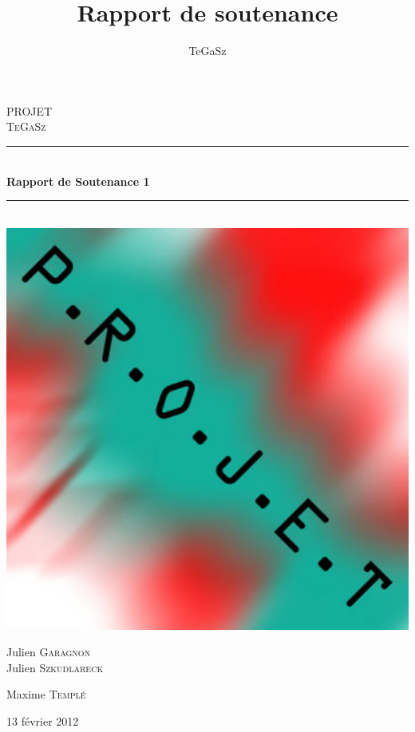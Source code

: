 \documentclass[12pt]{report}
\title{Rapport de soutenance \no{1}}
\date{}
\author{TeGaSz}
\newcommand{\HRule}{\rule{\linewidth}{0.5mm}}
\begin{document}
\begin{titlepage}



\begin{center}



\textsc{\LARGE PROJET}\\[1.5cm]

\textsc{\Large TeGaSz}\\[0.5cm]


\HRule \\[0.4cm]
{ \huge \bfseries Rapport de Soutenance 1}\\[0.4cm]
  
\HRule \\[1.5cm]
\includegraphics[width=1\textwidth]{./name.jpg}\\[1cm]  
\begin{minipage}{0.4\textwidth}
\begin{flushleft} \large
Julien \textsc{Garagnon}\\
Julien \textsc{Szkudlareck}
\end{flushleft}
\end{minipage}
\begin{minipage}{0.4\textwidth}
\begin{flushright} \large
Maxime \textsc{Templé}\\

\end{flushright}
\end{minipage}

\vfill

{\large 13 février 2012}

\end{center}

\end{titlepage}
\end{document}

